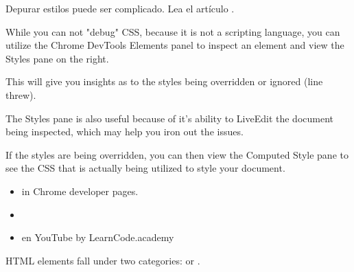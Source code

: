 
Depurar estilos puede ser complicado. Lea el artículo
.

While you can not "debug" CSS, because it is not a scripting language,
you can utilize the Chrome DevTools Elements panel to inspect an element and
view the Styles pane on the right. 

This will give you
insights as to the styles being overridden or ignored (line threw). 

The Styles pane is also useful because of it's ability to LiveEdit the document being inspected, which may help you iron out the
issues. 

If the styles are being overridden, you can then view the Computed Style pane to see the CSS that is actually being utilized to style your document.

\begin{itemize}
\item
{}
in Chrome developer pages.
\item
{}
\item
{} en YouTube by LearnCode.academy
\end{itemize}


HTML elements fall under two categories:  or .


